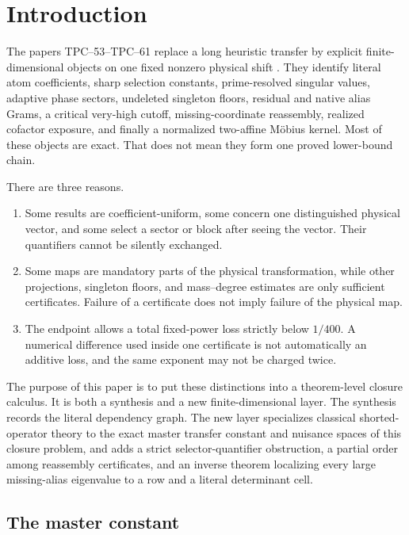 \section{Introduction}
\label{sec:tpc62-introduction}

The papers TPC--53--TPC--61 replace a long heuristic transfer by explicit
finite-dimensional objects on one fixed nonzero physical shift
\citep{WangTPC53,WangTPC54,WangTPC55,WangTPC56,WangTPC57,WangTPC58,
WangTPC59,WangTPC60,WangTPC61}.  They identify literal atom coefficients,
sharp selection constants, prime-resolved singular values, adaptive phase
sectors, undeleted singleton floors, residual and native alias Grams, a
critical very-high cutoff, missing-coordinate reassembly, realized cofactor
exposure, and finally a normalized two-affine M\"obius kernel.  Most of these
objects are exact.  That does not mean they form one proved lower-bound
chain.

There are three reasons.
\begin{enumerate}[leftmargin=2.3em]
 \item Some results are coefficient-uniform, some concern one distinguished
       physical vector, and some select a sector or block after seeing the
       vector.  Their quantifiers cannot be silently exchanged.
 \item Some maps are mandatory parts of the physical transformation, while
       other projections, singleton floors, and mass--degree estimates are
       only sufficient certificates.  Failure of a certificate does not
       imply failure of the physical map.
 \item The endpoint allows a total fixed-power loss strictly below
       \(1/400\).  A numerical difference used inside one certificate is
       not automatically an additive loss, and the same exponent may not be
       charged twice.
\end{enumerate}

The purpose of this paper is to put these distinctions into a theorem-level
closure calculus.  It is both a synthesis and a new finite-dimensional
layer.  The synthesis records the literal dependency graph.  The new layer
specializes classical shorted-operator theory to the exact master transfer
constant and nuisance spaces of this closure problem, and adds a strict
selector-quantifier obstruction, a partial order among reassembly
certificates, and an inverse theorem localizing every large missing-alias
eigenvalue to a row and a literal determinant cell.

\subsection{The master constant}

